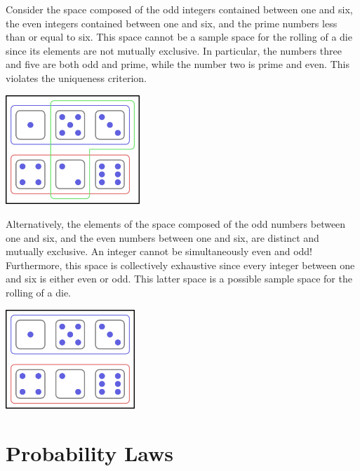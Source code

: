 \begin{example}
Consider the space composed of the odd integers contained between one and six, the even integers contained between one and six, and the prime numbers less than or equal to six.
This space cannot be a sample space for the rolling of a die since its elements are not mutually exclusive.
In particular, the numbers three and five are both odd and prime, while the number two is prime and even.
This violates the uniqueness criterion.

\begin{center}
\includegraphics[height=4.125cm]{Figures/2Chapter/nonadmissiblespace}
\end{center}

Alternatively, the elements of the space composed of the odd numbers between one and six, and the even numbers between one and six, are distinct and mutually exclusive.
An integer cannot be simultaneously even and odd!
Furthermore, this space is collectively exhaustive since every integer between one and six is either even or odd.
This latter space is a possible sample space for the rolling of a die.

\begin{center}
\includegraphics[height=3.75cm]{Figures/2Chapter/admissiblespace}
\end{center}
\end{example}


\section{Probability Laws}
\label{section:ProbabilityLaws}

